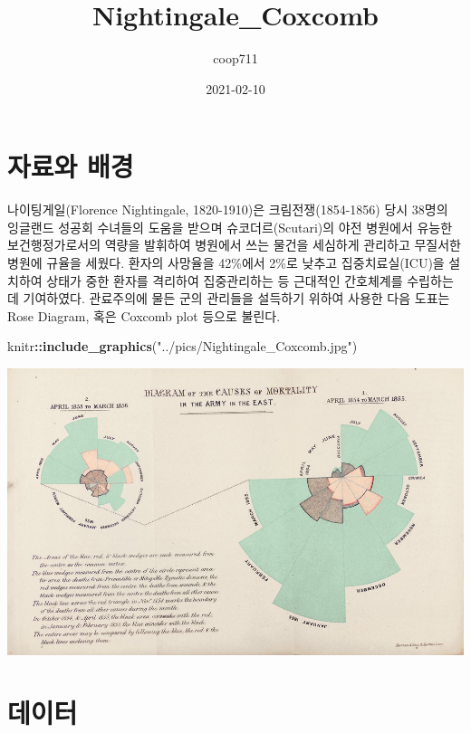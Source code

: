 \documentclass[
]{article}
\title{Nightingale\_Coxcomb}
\author{coop711}
\date{2021-02-10}
\newenvironment{Shaded}{\begin{snugshade}}{\end{snugshade}}
\newcommand{\KeywordTok}[1]{\textcolor[rgb]{0.13,0.29,0.53}{\textbf{#1}}}
\newcommand{\NormalTok}[1]{#1}
\newcommand{\OperatorTok}[1]{\textcolor[rgb]{0.81,0.36,0.00}{\textbf{#1}}}
\newcommand{\StringTok}[1]{\textcolor[rgb]{0.31,0.60,0.02}{#1}}
\begin{document}
\maketitle

\hypertarget{uxc790uxb8ccuxc640-uxbc30uxacbd}{%
\section{자료와 배경}\label{uxc790uxb8ccuxc640-uxbc30uxacbd}}

나이팅게일(Florence Nightingale, 1820-1910)은 크림전쟁(1854-1856) 당시
38명의 잉글랜드 성공회 수녀들의 도움을 받으며 슈코더르(Scutari)의 야전
병원에서 유능한 보건행정가로서의 역량을 발휘하여 병원에서 쓰는 물건을
세심하게 관리하고 무질서한 병원에 규율을 세웠다. 환자의 사망율을
42\%에서 2\%로 낮추고 집중치료실(ICU)을 설치하여 상태가 중한 환자를
격리하여 집중관리하는 등 근대적인 간호체계를 수립하는 데 기여하였다.
관료주의에 물든 군의 관리들을 설득하기 위하여 사용한 다음 도표는 Rose
Diagram, 혹은 Coxcomb plot 등으로 불린다.

\begin{Shaded}
\begin{Highlighting}[]
\NormalTok{knitr}\OperatorTok{::}\KeywordTok{include_graphics}\NormalTok{(}\StringTok{"../pics/Nightingale_Coxcomb.jpg"}\NormalTok{)}
\end{Highlighting}
\end{Shaded}

\includegraphics[width=1\linewidth]{../pics/Nightingale_Coxcomb}

\hypertarget{uxb370uxc774uxd130}{%
\section{데이터}\label{uxb370uxc774uxd130}}
\end{document}
